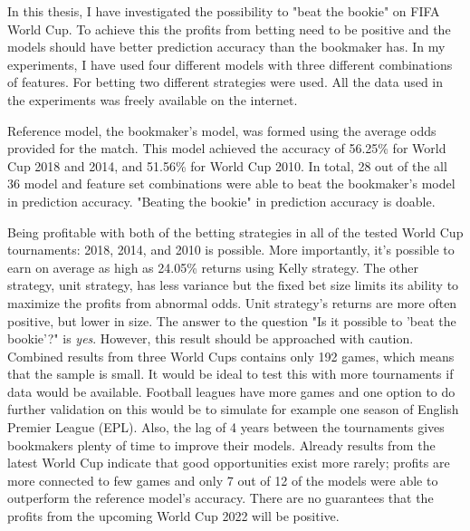 In this thesis, I have investigated the possibility to "beat the bookie" on FIFA World Cup. To achieve this the profits from betting need to be positive and the models should have better prediction accuracy than the bookmaker has. In my experiments, I have used four different models with three different combinations of features. For betting two different strategies were used. All the data used in the experiments was freely available on the internet.

Reference model, the bookmaker's model, was formed using the average odds provided for the match. This model achieved the accuracy of 56.25\% for World Cup 2018 and 2014, and 51.56\% for World Cup 2010. In total, 28 out of the all 36 model and feature set combinations were able to beat the bookmaker's model in prediction accuracy. "Beating the bookie" in prediction accuracy is doable.

Being profitable with both of the betting strategies in all of the tested World Cup tournaments: 2018, 2014, and 2010 is possible. More importantly, it's possible to earn on average as high as 24.05\% returns using Kelly strategy. The other strategy, unit strategy, has less variance but the fixed bet size limits its ability to maximize the profits from abnormal odds. Unit strategy's returns are more often positive, but lower in size. The answer to the question
"Is it possible to 'beat the bookie'?" is \textit{yes}. However, this result should be approached with caution. Combined results from three World Cups contains only 192 games, which means that the sample is small. It would be ideal to test this with more tournaments if data would be available. Football leagues have more games and one option to do further validation on this would be to simulate for example one season of English Premier League (EPL). Also, the lag of 4 years between the tournaments gives bookmakers plenty of time to improve their models. Already results from the latest World Cup indicate that good opportunities exist more rarely; profits are more connected to few games and only 7 out of 12 of the models were able to outperform the reference model's accuracy. There are no guarantees that the profits from the upcoming World Cup 2022 will be positive.

